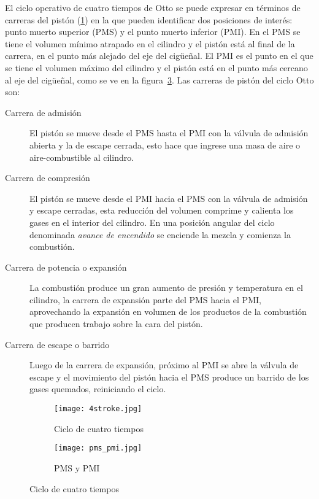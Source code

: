 El ciclo operativo de cuatro tiempos de Otto se puede expresar en términos de
carreras del pistón (\ref{fig:4tiempos}) en la que pueden identificar dos
posiciones de interés: punto muerto superior (PMS) y el punto muerto inferior
(PMI).
%
En el PMS se tiene el volumen mínimo atrapado en el cilindro y el pistón está al
final de la carrera, en el punto más alejado del eje del cigüeñal.
%
El PMI es el punto en el que se tiene el volumen máximo del cilindro y el pistón
está en el punto más cercano al eje del cigüeñal, como se ve en la
figura~\ref{fig:pms_pmi}.
%
Las carreras de pistón del ciclo Otto son:
%
\begin{description}
%
    \item [Carrera de admisión] El pistón se mueve desde el PMS hasta el PMI con
la válvula de admisión abierta y la de escape cerrada, esto hace que ingrese una
masa de aire o aire-combustible al cilindro.
%
    \item [Carrera de compresión] El pistón se mueve desde el PMI hacia el PMS
con la válvula de admisión y escape cerradas, esta reducción del volumen
comprime y calienta los gases en el interior del cilindro.
        En una posición angular del ciclo denominada \emph{avance de encendido}
se enciende la mezcla y comienza la combustión.
%
    \item [Carrera de potencia o expansión] La combustión produce un gran
aumento de presión y temperatura en el cilindro, la carrera de expansión parte
del PMS hacia el PMI, aprovechando la expansión en volumen de los productos de
la combustión que producen trabajo sobre la cara del pistón.
%
    \item [Carrera de escape o barrido] Luego de la carrera de expansión,
próximo al PMI se abre la válvula de escape y el movimiento del pistón hacia el
PMS produce un barrido de los gases quemados, reiniciando el ciclo.
%
\end{description}

\begin{figure}
  \centering
  \begin{subfigure}{0.6\textwidth}
    \centering
    \texttt{[image: 4stroke.jpg]}
    \caption{Ciclo de cuatro tiempos}\label{fig:4tiempos} %
  \end{subfigure}%
  \begin{subfigure}{0.4\textwidth}
    \centering
    \texttt{[image: pms\_pmi.jpg]}
    \caption{PMS y PMI}\label{fig:pms_pmi}
  \end{subfigure}
  \caption{Ciclo de cuatro tiempos}
\end{figure}

